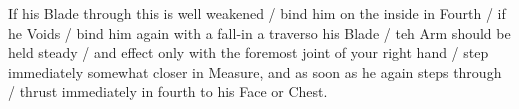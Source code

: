 
If his Blade through this is well weakened / bind him on the inside in
Fourth / if he Voids / bind him again with a fall-in a traverso his
Blade / teh Arm should be held steady / and effect only with the
foremost joint of your right hand / step immediately somewhat closer
in Measure, and as soon as he again steps through / thrust immediately
in fourth to his Face or Chest.
